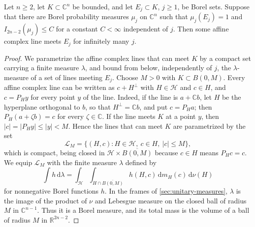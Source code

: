\begin{theorem}\label{thm:complex-line-incidence}
Let $n\geq2$, let $K\subset\mathbb C^n$ be bounded, and let $E_j\subset K$, $j\geq1$, be Borel sets. Suppose that there are Borel probability measures $\mu_j$ on $\mathbb C^n$ such that $\mu_j(E_j)=1$ and $I_{2n-2}(\mu_j)\leq C$ for a constant $C<\infty$ independent of $j$. Then some affine complex line meets $E_j$ for infinitely many $j$.
\end{theorem}
\begin{proof}
We parametrize the affine complex lines that can meet $K$ by a compact set carrying a finite measure $\lambda$, and bound from below, independently of $j$, the $\lambda$-measure of a set of lines meeting $E_j$. Choose $M>0$ with $K\subset B(0,M)$. Every affine complex line can be written as $c+H^\perp$ with $H\in\mathcal H$ and $c\in H$, and $c=P_Hy$ for every point $y$ of the line. Indeed, if the line is $a+\mathbb Cb$, let $H$ be the hyperplane orthogonal to $b$, so that $H^\perp=\mathbb Cb$, and put $c=P_Ha$; then $P_H(a+\zeta b)=c$ for every $\zeta\in\mathbb C$. If the line meets $K$ at a point $y$, then $|c|=|P_Hy|\leq|y|<M$. Hence the lines that can meet $K$ are parametrized by the set
\[
 \mathcal L_M=\{(H,c):H\in\mathcal H,\ c\in H,\ |c|\leq M\},
\]
which is compact, being closed in $\mathcal H\times\overline{B(0,M)}$ because $c\in H$ means $P_Hc=c$. We equip $\mathcal L_M$ with the finite measure $\lambda$ defined by
\[
 \int h\,\mathrm d\lambda=\int_{\mathcal H}\int_{H\cap\overline{B(0,M)}}h(H,c)\,\mathrm d m_H(c)\,\mathrm d\nu(H)
\]
for nonnegative Borel functions $h$. In the frames of \cref{sec:unitary-measures}, $\lambda$ is the image of the product of $\nu$ and Lebesgue measure on the closed ball of radius $M$ in $\mathbb C^{n-1}$. Thus it is a Borel measure, and its total mass is the volume of a ball of radius $M$ in $\mathbb R^{2n-2}$.


\end{proof}
